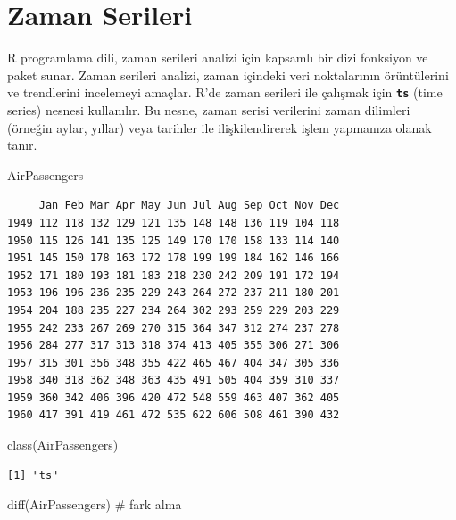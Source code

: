 \documentclass[
  letterpaper,
  DIV=11,
  numbers=noendperiod]{scrreprt}
\newenvironment{Shaded}{\begin{snugshade}}{\end{snugshade}}
\newcommand{\CommentTok}[1]{\textcolor[rgb]{0.37,0.37,0.37}{#1}}
\newcommand{\FunctionTok}[1]{\textcolor[rgb]{0.28,0.35,0.67}{#1}}
\newcommand{\NormalTok}[1]{\textcolor[rgb]{0.00,0.23,0.31}{#1}}
\begin{document}
\section*{Zaman Serileri}\label{zaman-serileri}


R programlama dili, zaman serileri analizi için kapsamlı bir dizi
fonksiyon ve paket sunar. Zaman serileri analizi, zaman içindeki veri
noktalarının örüntülerini ve trendlerini incelemeyi amaçlar. R'de zaman
serileri ile çalışmak için \textbf{\texttt{ts}} (time series) nesnesi
kullanılır. Bu nesne, zaman serisi verilerini zaman dilimleri (örneğin
aylar, yıllar) veya tarihler ile ilişkilendirerek işlem yapmanıza olanak
tanır.

\begin{Shaded}
\begin{Highlighting}[]
\NormalTok{AirPassengers}
\end{Highlighting}
\end{Shaded}

\begin{verbatim}
     Jan Feb Mar Apr May Jun Jul Aug Sep Oct Nov Dec
1949 112 118 132 129 121 135 148 148 136 119 104 118
1950 115 126 141 135 125 149 170 170 158 133 114 140
1951 145 150 178 163 172 178 199 199 184 162 146 166
1952 171 180 193 181 183 218 230 242 209 191 172 194
1953 196 196 236 235 229 243 264 272 237 211 180 201
1954 204 188 235 227 234 264 302 293 259 229 203 229
1955 242 233 267 269 270 315 364 347 312 274 237 278
1956 284 277 317 313 318 374 413 405 355 306 271 306
1957 315 301 356 348 355 422 465 467 404 347 305 336
1958 340 318 362 348 363 435 491 505 404 359 310 337
1959 360 342 406 396 420 472 548 559 463 407 362 405
1960 417 391 419 461 472 535 622 606 508 461 390 432
\end{verbatim}

\begin{Shaded}
\begin{Highlighting}[]
\FunctionTok{class}\NormalTok{(AirPassengers)}
\end{Highlighting}
\end{Shaded}

\begin{verbatim}
[1] "ts"
\end{verbatim}

\begin{Shaded}
\begin{Highlighting}[]
\FunctionTok{diff}\NormalTok{(AirPassengers) }\CommentTok{\# fark alma}
\end{Highlighting}
\end{Shaded}
\end{document}
